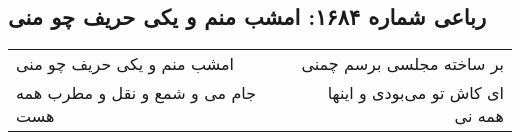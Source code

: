 \begin{center}
\section*{رباعی شماره ۱۶۸۴: امشب منم و یکی حریف چو منی}
\label{sec:1684}
\begin{longtable}{l p{0.5cm} r}
امشب منم و یکی حریف چو منی
&&
بر ساخته مجلسی برسم چمنی
\\
جام می و شمع و نقل و مطرب همه هست
&&
ای کاش تو می‌بودی و اینها همه نی
\\
\end{longtable}
\end{center}
